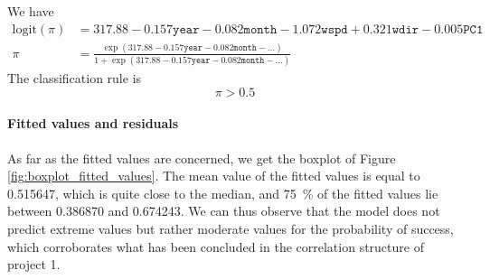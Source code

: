 \documentclass[a4paper, 12pt]{article}
\begin{document}
    We have
    \begin{align*}
        \mathrm{logit}(\pi) & = 317.88 - 0.157 \texttt{year} - 0.082\texttt{month} - 1.072\texttt{wspd} + 0.321\texttt{wdir} - 0.005\texttt{PC1}\\
        \pi & = \frac{\exp(317.88 - 0.157 \texttt{year} - 0.082 \texttt{month} - \ldots)}{1 + \exp(317.88 - 0.157 \texttt{year} - 0.082\texttt{month} - \ldots)} 
    \end{align*}
	The classification rule is
	\begin{equation*}
	    \pi > 0.5
	\end{equation*}
	
	\paragraph{Fitted values and residuals}
	As far as the fitted values are concerned, we get the boxplot of Figure \ref{fig:boxplot_fitted_values}. The mean value of the fitted values is equal to \num{0.515647}, which is quite close to the median, and \SI{75}{\percent} of the fitted values lie between \num{0.386870} and \num{0.674243}. We can thus observe that the model does not predict extreme values but rather moderate values for the probability of success, which corroborates what has been concluded in the correlation structure of project 1.
\end{document}
